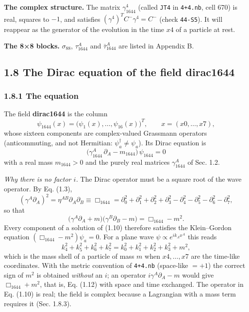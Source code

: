 \documentclass[
  10pt,
]{article}
\begin{document}
\textbf{The complex structure.} The matrix \(\gamma_{1644}^4\) (called
\texttt{JT4} in \texttt{4+4.nb}, cell 670) is real, squares to \(-1\),
and satisfies \((\gamma^4)^TC^{-}\gamma^4=C^{-}\) (check
\texttt{44-S5}). It will reappear as the generator of the evolution in
the time \(x4\) of a particle at rest.

\textbf{The 8×8 blocks.} \(\sigma_{88}\), \(\tau_{1644}^A\) and
\(\bar\tau_{1644}^A\) are listed in Appendix B.

\hypertarget{the-dirac-equation-of-the-field-dirac1644}{%
\subsection{1.8 The Dirac equation of the field
dirac1644}\label{the-dirac-equation-of-the-field-dirac1644}}

\hypertarget{the-equation}{%
\subsubsection{1.8.1 The equation}\label{the-equation}}

The field \textbf{dirac1644} is the column
\[\psi_{1644}(x)=\big(\psi_1(x),\dots,\psi_{16}(x)\big)^T,\qquad x=(x0,\dots,x7),\]
whose sixteen components are complex-valued Grassmann operators
(anticommuting, and not Hermitian: \(\psi_a^\dagger\neq\psi_a\)). Its
Dirac equation is
\[\boxed{\;\big(\gamma_{1644}^A\,\partial_A-m_{1644}\big)\,\psi_{1644}=0\;}\tag{1.10}\]
with a real mass \(m_{1644}>0\) and the purely real matrices
\(\gamma_{1644}^A\) of Sec. 1.2.

\emph{Why there is no factor \(i\).} The Dirac operator must be a square
root of the wave operator. By Eq. (1.3),
\[(\gamma^A\partial_A)^2=\eta^{AB}\partial_A\partial_B\equiv\Box_{1644}
=\partial_0^2+\partial_1^2+\partial_2^2+\partial_3^2-\partial_4^2-\partial_5^2-\partial_6^2-\partial_7^2,\]
so that
\[\big(\gamma^A\partial_A+m\big)\big(\gamma^B\partial_B-m\big)=\Box_{1644}-m^2 .\tag{1.11}\]
Every component of a solution of (1.10) therefore satisfies the
Klein--Gordon equation \((\Box_{1644}-m^2)\psi_a=0\). For a plane wave
\(\psi\propto e^{ik_Ax^A}\) this reads
\[k_4^2+k_5^2+k_6^2+k_7^2=k_0^2+k_1^2+k_2^2+k_3^2+m^2,\tag{1.12}\] which
is the mass shell of a particle of mass \(m\) when \(x4,\dots,x7\) are
the time-like coordinates. With the metric convention of \texttt{4+4.nb}
(space-like \(=+1\)) the correct sign of \(m^2\) is obtained
\emph{without} an \(i\); an operator \(i\gamma^A\partial_A-m\) would
give \(\Box_{1644}+m^2\), that is, Eq. (1.12) with space and time
exchanged. The operator in Eq. (1.10) is real; the field is complex
because a Lagrangian with a mass term requires it (Sec. 1.8.3).
\end{document}
